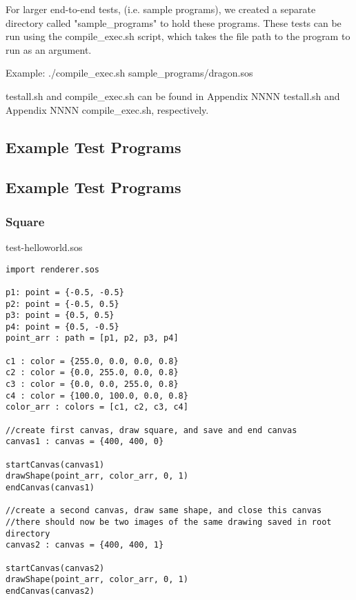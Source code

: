 \documentclass[main.tex]{subfiles}
\begin{document}
	For larger end-to-end tests, (i.e. sample programs), we created a separate directory called "sample\_programs" to hold these programs. These tests can be run using the compile\_exec.sh script, which takes the file path to the program to run as an argument.
	
	Example: ./compile\_exec.sh sample\_programs/dragon.sos
	
	testall.sh and compile\_exec.sh can be found in Appendix NNNN testall.sh and Appendix NNNN compile\_exec.sh, respectively. 
	
	\newpage
	\subsection{Example Test Programs}
	
	\subsection{Example Test Programs}
	\subsubsection{Square}
	\colorbox{blue!30}{test-helloworld.sos}
	\begin{lstlisting}
import renderer.sos

p1: point = {-0.5, -0.5}
p2: point = {-0.5, 0.5}
p3: point = {0.5, 0.5}
p4: point = {0.5, -0.5}
point_arr : path = [p1, p2, p3, p4] 

c1 : color = {255.0, 0.0, 0.0, 0.8}
c2 : color = {0.0, 255.0, 0.0, 0.8}
c3 : color = {0.0, 0.0, 255.0, 0.8}
c4 : color = {100.0, 100.0, 0.0, 0.8}
color_arr : colors = [c1, c2, c3, c4] 

//create first canvas, draw square, and save and end canvas
canvas1 : canvas = {400, 400, 0}

startCanvas(canvas1)
drawShape(point_arr, color_arr, 0, 1)
endCanvas(canvas1)

//create a second canvas, draw same shape, and close this canvas
//there should now be two images of the same drawing saved in root directory
canvas2 : canvas = {400, 400, 1}

startCanvas(canvas2)
drawShape(point_arr, color_arr, 0, 1)
endCanvas(canvas2)
\end{lstlisting}
\end{document}
